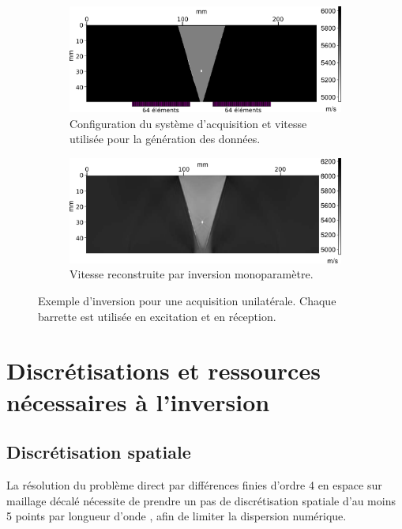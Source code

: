 \begin{figure}[!h]
	\begin{subfigure}[b]{0.5\textwidth}
		\centering
		\includegraphics[width=\textwidth]{img/config_reelle_true.png}
		\caption{Configuration du système d'acquisition et vitesse utilisée pour la génération des données.\label{app:iso:reel1}}	
	\end{subfigure}
	\hspace{0.2cm}
	\begin{subfigure}[b]{0.5\textwidth}
		\centering
		\includegraphics[width=\textwidth]{img/config_reelle_rec.png}
		\caption{Vitesse reconstruite par inversion monoparamètre. \label{app:iso:reel2}}	
	\end{subfigure}
	\caption{Exemple d'inversion pour une acquisition unilatérale. Chaque barrette est utilisée en excitation et en réception.}
\end{figure}



\chapter{Discrétisations et ressources nécessaires à l'inversion \label{annexe:chiffres}}

\section*{Discrétisation spatiale}
La résolution du problème direct par différences finies d'ordre 4 en espace sur maillage décalé nécessite de prendre un pas de discrétisation spatiale d'au moins 5 points par longueur d'onde \citep{levander}, afin de limiter la dispersion numérique.\\

